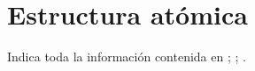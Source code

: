 \section{Estructura atómica}

\begin{prob}
Indica toda la información contenida en ; ;
.
\end{prob}


